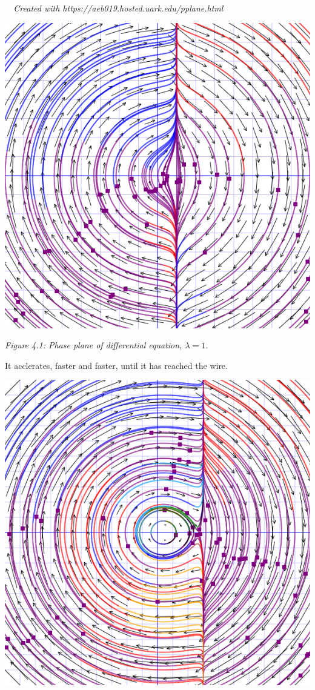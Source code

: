 \documentclass[11pt]{article}
\begin{document}
    \begin{solution}\textit{$\text{ }$ \newline Created with https://aeb019.hosted.uark.edu/pplane.html}
        \begin{center}
            \includegraphics[scale=0.3]{41.png}
        \end{center}
        \begin{center}
            \textit{Figure 4.1: Phase plane of differential equation, $\lambda = 1$.}
        \end{center}
        It acclerates, faster and faster, until it has reached the wire.
        \begin{center}
            \includegraphics[scale=0.3]{43.png}

\end{center}
\end{solution}
\end{document}

